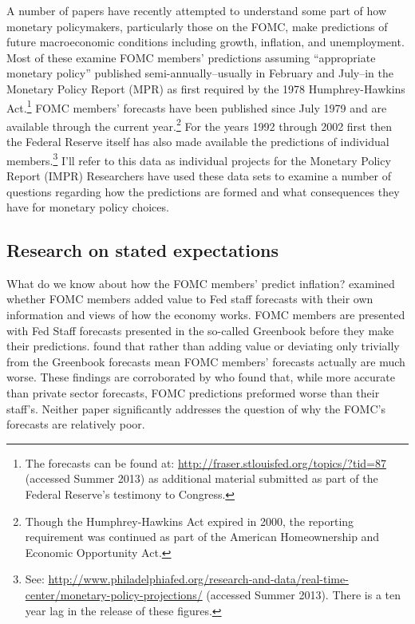 \documentclass[a4paper]{article}\usepackage{graphicx, color}
\begin{document}
A number of papers have recently attempted to understand some part of how monetary policymakers, particularly those on the FOMC, make predictions of future macroeconomic conditions including growth, inflation, and unemployment. Most of these examine FOMC members' predictions assuming ``appropriate monetary policy'' published semi-annually--usually in February and July--in the Monetary Policy Report (MPR) as first required by the 1978  Humphrey-Hawkins Act.\footnote{The forecasts can be found at: \url{http://fraser.stlouisfed.org/topics/?tid=87} (accessed Summer 2013) as additional material submitted as part of the Federal Reserve's testimony to Congress.} FOMC members' forecasts have been published since July 1979 and are available through the current year.\footnote{Though the Humphrey-Hawkins Act expired in 2000, the reporting requirement was continued as part of the American Homeownership and Economic Opportunity Act.} For the years 1992 through 2002 first \cite{Romer2010Data} then the Federal Reserve itself has also made available the predictions of individual members.\footnote{See: \url{http://www.philadelphiafed.org/research-and-data/real-time-center/monetary-policy-projections/} (accessed Summer 2013). There is a ten year lag in the release of these figures.} I'll refer to this data as individual projects for the Monetary Policy Report (IMPR) Researchers have used these data sets to examine a number of questions regarding how the predictions are formed and what consequences they have for monetary policy choices. 

\subsection{Research on stated expectations}

What do we know about how the FOMC members' predict inflation? \cite{RomerRomer2008} examined whether FOMC members added value to Fed staff forecasts with their own information and views of how the economy works. FOMC members are presented with Fed Staff forecasts presented in the so-called Greenbook before they make their predictions. \cite{RomerRomer2008} found that rather than adding value or deviating only trivially from the Greenbook forecasts mean FOMC members' forecasts actually are much worse. These findings are corroborated by \cite{Gavin2003} who found that, while more accurate than private sector forecasts, FOMC predictions preformed worse than their staff's. Neither paper significantly addresses the question of why the FOMC's forecasts are relatively poor. 
\end{document}
